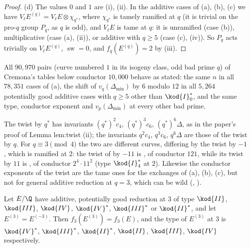 \begin{proof}
(d) The values $0$ and $1$ are (i), (ii). In the additive cases of (a), (b), (c) we have
$V_\ell E^{(q)}=V_\ell E\otimes\chi_{q^*}$, where $\chi_{q^*}$ is tamely ramified at $q$ (it is trivial on the pro-$q$ group $P_q$, as $q$ is
odd), and $V_\ell E$ is tame at $q$: it is unramified (case (b)), multiplicative (case (a), (ii)), or
additive with $q\ge5$ (case (c), (iv)). So $P_q$ acts trivially on $V_\ell E^{(q)}$,
$\operatorname{sw}=0$, and $f_q(E^{(q)})=2$ by (iii).
\end{proof}

All $90{,}970$ pairs (curve numbered $1$ in its isogeny class, odd bad prime $q$) of Cremona's tables below conductor $10{,}000$
behave as stated: the same $n$ in all $78{,}351$ cases of (a), the shift of $v_q(\Delta_{\min})$ by $6$ modulo $12$ in all $5{,}264$
potentially good additive cases with $q\ge5$ other than $\kod{I}_0^*$, and the same type, conductor exponent and $v_p(\Delta_{\min})$ at
every other bad prime.

\begin{warning}\label{warn:reduction:q-versus-qstar}
The twist by $q^*$ has invariants $(q^*)^2c_4$, $(q^*)^3c_6$, $(q^*)^6\Delta$, as in the paper's proof of Lemma lem:twist (ii); the
invariants $q^2c_4$, $q^3c_6$, $q^6\Delta$ are those of the twist by $q$. For $q\equiv3\pmod4$ the two are
different curves, differing by the twist by $-1$, which is ramified at $2$: the twist of  by $-11$ is , of
conductor $121$, while its twist by $11$ is , of conductor $2^4\cdot11^2$ (type $\kod{I}_4^*$ at $2$). Likewise the conductor exponents of the twist are the tame ones for the exchanges of (a), (b), (c),
but not for general additive reduction at $q=3$, which can be wild (, ).
\end{warning}

\begin{proposition}[the exchanges at $q=3$]\label{prop:reduction:twist-at-3}
Let $E/\Q$ have additive, potentially good reduction at $3$ of type $\kod{II}$, $\kod{III}$, $\kod{IV}$, $\kod{IV}^*$, $\kod{III}^*$ or $\kod{II}^*$, and
let $E^{(3)}=E^{(-3)}$. Then $f_3(E^{(3)})=f_3(E)$, and the type of $E^{(3)}$ at $3$ is $\kod{IV}^*$, $\kod{III}^*$, $\kod{II}^*$, $\kod{II}$, $\kod{III}$,
$\kod{IV}$ respectively.
\end{proposition}

